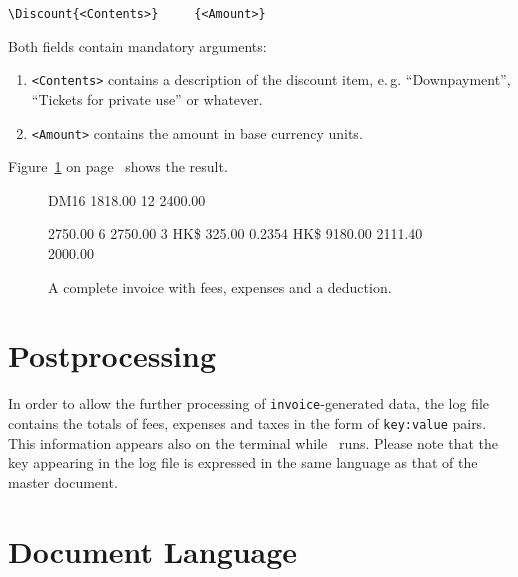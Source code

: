 \documentclass[11pt]{ltxdoc}
\begin{document}
\begin{verbatim}
\Discount{<Contents>}     {<Amount>}
\end{verbatim}

Both fields contain mandatory arguments:

\begin{enumerate}
	\item \texttt{<Contents>} contains a description of the
		discount item, e.\,g. ``Downpayment'', ``Tickets for 
		private use'' or whatever.
	\item \texttt{<Amount>} contains the amount in base currency
		units.
\end{enumerate}

Figure~\ref{full_and_discounted_invoice} on
page~\pageref{full_and_discounted_invoice}
shows the result.

\begin{figure}[h]
\begin{invoice}{DM}{16}
			{1818.00}	{12}
       		{2400.00}

          {2750.00}   { 6}
           {2750.00}   { 3}
        {HK\$}  {325.00} {0.2354}   {}
              {HK\$}  {9180.00}   {} {2111.40}
         {2000.00}
\end{invoice}
\caption{A complete invoice with fees,
		expenses and a deduction.\label{full_and_discounted_invoice}}
\end{figure}

\section{Postprocessing}

In order to allow the further processing of
\texttt{invoice}-generated data, the log file contains the totals of
fees, expenses and taxes in the form of \verb-key:value- pairs. This
information appears also on the terminal while \LaTeXe\ runs. Please
note that the key appearing in the log file is expressed in the same
language as that of the master document.

\section{Document Language}
\end{document}

